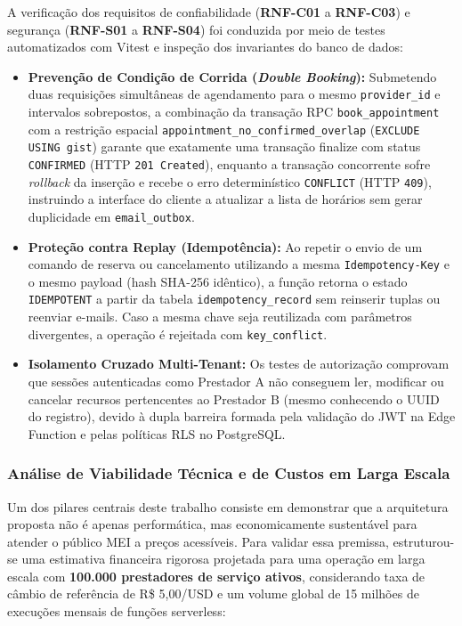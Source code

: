 \documentclass[12pt,a4paper]{article}
\begin{document}
A verificação dos requisitos de confiabilidade (\textbf{RNF-C01} a \textbf{RNF-C03}) e segurança (\textbf{RNF-S01} a \textbf{RNF-S04}) foi conduzida por meio de testes automatizados com Vitest e inspeção dos invariantes do banco de dados:

\begin{itemize}
    \item \textbf{Prevenção de Condição de Corrida (\textit{Double Booking}):} Submetendo duas requisições simultâneas de agendamento para o mesmo \texttt{provider\_id} e intervalos sobrepostos, a combinação da transação RPC \texttt{book\_appointment} com a restrição espacial \texttt{appointment\_no\_confirmed\_overlap} (\texttt{EXCLUDE USING gist}) garante que exatamente uma transação finalize com status \texttt{CONFIRMED} (HTTP \texttt{201 Created}), enquanto a transação concorrente sofre \textit{rollback} da inserção e recebe o erro determinístico \texttt{CONFLICT} (HTTP \texttt{409}), instruindo a interface do cliente a atualizar a lista de horários sem gerar duplicidade em \texttt{email\_outbox}.
    \item \textbf{Proteção contra Replay (Idempotência):} Ao repetir o envio de um comando de reserva ou cancelamento utilizando a mesma \texttt{Idempotency-Key} e o mesmo payload (hash SHA-256 idêntico), a função retorna o estado \texttt{IDEMPOTENT} a partir da tabela \texttt{idempotency\_record} sem reinserir tuplas ou reenviar e-mails. Caso a mesma chave seja reutilizada com parâmetros divergentes, a operação é rejeitada com \texttt{key\_conflict}.
    \item \textbf{Isolamento Cruzado Multi-Tenant:} Os testes de autorização comprovam que sessões autenticadas como Prestador A não conseguem ler, modificar ou cancelar recursos pertencentes ao Prestador B (mesmo conhecendo o UUID do registro), devido à dupla barreira formada pela validação do JWT na Edge Function e pelas políticas RLS no PostgreSQL.
\end{itemize}

\subsubsection{Análise de Viabilidade Técnica e de Custos em Larga Escala}
\label{subsubsec:viabilidade_custos}

Um dos pilares centrais deste trabalho consiste em demonstrar que a arquitetura proposta não é apenas performática, mas economicamente sustentável para atender o público MEI a preços acessíveis. Para validar essa premissa, estruturou-se uma estimativa financeira rigorosa projetada para uma operação em larga escala com \textbf{100.000 prestadores de serviço ativos}, considerando taxa de câmbio de referência de R\$ 5,00/USD e um volume global de 15 milhões de execuções mensais de funções serverless:
\end{document}
